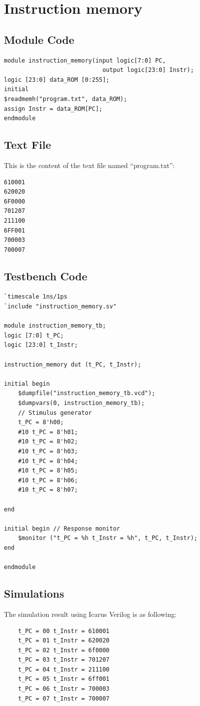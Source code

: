 \documentclass{article}
\begin{document}
\newpage
\section{Instruction memory}

\subsection{Module Code}
\begin{lstlisting}
module instruction_memory(input logic[7:0] PC,
                            output logic[23:0] Instr);
logic [23:0] data_ROM [0:255];
initial
$readmemh("program.txt", data_ROM); 
assign Instr = data_ROM[PC]; 
endmodule
\end{lstlisting}

\subsection{Text File}
This is the content of the text file named ``program.txt'':
\begin{Verbatim}
610001
620020
6F0000
701207
211100
6FF001
700003
700007
\end{Verbatim}

\subsection{Testbench Code}
\begin{lstlisting}
`timescale 1ns/1ps 
`include "instruction_memory.sv"

module instruction_memory_tb;
logic [7:0] t_PC;
logic [23:0] t_Instr;

instruction_memory dut (t_PC, t_Instr);

initial begin
    $dumpfile("instruction_memory_tb.vcd"); 
    $dumpvars(0, instruction_memory_tb);
    // Stimulus generator
    t_PC = 8'h00; 
    #10 t_PC = 8'h01;
    #10 t_PC = 8'h02;
    #10 t_PC = 8'h03;
    #10 t_PC = 8'h04;
    #10 t_PC = 8'h05;
    #10 t_PC = 8'h06;
    #10 t_PC = 8'h07;
    
end

initial begin // Response monitor
    $monitor ("t_PC = %h t_Instr = %h", t_PC, t_Instr);
end

endmodule
\end{lstlisting}

\subsection{Simulations}
The simulation result using Icarus Verilog is as following:
\begin{Verbatim}
    t_PC = 00 t_Instr = 610001
    t_PC = 01 t_Instr = 620020
    t_PC = 02 t_Instr = 6f0000
    t_PC = 03 t_Instr = 701207
    t_PC = 04 t_Instr = 211100
    t_PC = 05 t_Instr = 6ff001
    t_PC = 06 t_Instr = 700003
    t_PC = 07 t_Instr = 700007
\end{Verbatim}
\end{document}
